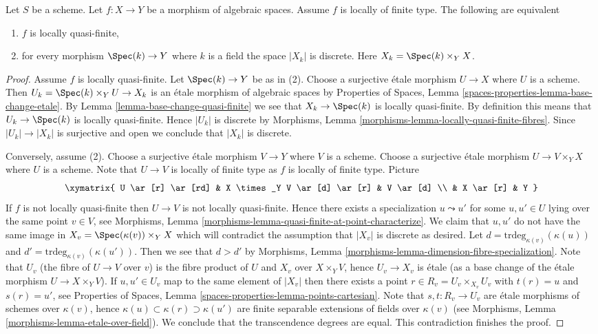 \begin{lemma}
\label{lemma-locally-quasi-finite}
Let $S$ be a scheme. Let $f : X \to Y$ be a morphism of algebraic spaces.
Assume $f$ is locally of finite type. The following are equivalent
\begin{enumerate}
\item $f$ is locally quasi-finite,
\item for every morphism $\Spec(k) \to Y$ where $k$ is a field
the space $|X_k|$ is discrete. Here $X_k = \Spec(k) \times_Y X$.
\end{enumerate}
\end{lemma}

\begin{proof}
Assume $f$ is locally quasi-finite. Let $\Spec(k) \to Y$ be as
in (2). Choose a surjective \'etale morphism $U \to X$ where $U$ is a scheme.
Then $U_k = \Spec(k) \times_Y U \to X_k$ is an
\'etale morphism of algebraic spaces by
Properties of Spaces, Lemma \ref{spaces-properties-lemma-base-change-etale}.
By
Lemma \ref{lemma-base-change-quasi-finite}
we see that $X_k \to \Spec(k)$ is locally quasi-finite. By
definition this means that $U_k \to \Spec(k)$ is locally
quasi-finite. Hence $|U_k|$ is discrete by
Morphisms, Lemma \ref{morphisms-lemma-locally-quasi-finite-fibres}.
Since $|U_k| \to |X_k|$ is surjective and open we conclude that $|X_k|$
is discrete.

\medskip\noindent
Conversely, assume (2). Choose a surjective \'etale morphism $V \to Y$
where $V$ is a scheme. Choose a surjective \'etale morphism
$U \to V \times_Y X$ where $U$ is a scheme.
Note that $U \to V$ is locally of finite type as $f$ is locally of finite type.
Picture
$$
\xymatrix{
U \ar[r] \ar[rd] & X \times_Y V \ar[d] \ar[r] & V \ar[d] \\
& X \ar[r] & Y
}
$$
If $f$ is not locally quasi-finite then $U \to V$ is not locally quasi-finite.
Hence there exists a specialization $u \leadsto u'$ for some $u, u' \in U$
lying over the same point $v \in V$, see
Morphisms, Lemma \ref{morphisms-lemma-quasi-finite-at-point-characterize}.
We claim that $u, u'$ do not have the same image in
$X_v = \Spec(\kappa(v)) \times_Y X$
which will contradict the assumption that $|X_v|$ is discrete as desired.
Let $d = \text{trdeg}_{\kappa(v)}(\kappa(u))$ and
$d' = \text{trdeg}_{\kappa(v)}(\kappa(u'))$.
Then we see that $d > d'$ by
Morphisms, Lemma \ref{morphisms-lemma-dimension-fibre-specialization}.
Note that $U_v$ (the fibre of $U \to V$ over $v$) is the fibre product of
$U$ and $X_v$ over $X \times_Y V$, hence $U_v \to X_v$ is \'etale (as a
base change of the \'etale morphism $U \to X \times_Y V$). If
$u, u' \in U_v$ map to the same element of $|X_v|$ then there exists a point
$r \in R_v = U_v \times_{X_v} U_v$ with $t(r) = u$ and $s(r) = u'$, see
Properties of Spaces, Lemma \ref{spaces-properties-lemma-points-cartesian}.
Note that $s, t : R_v \to U_v$ are \'etale morphisms of schemes
over $\kappa(v)$, hence $\kappa(u) \subset \kappa(r) \supset \kappa(u')$
are finite separable extensions of fields over $\kappa(v)$ (see
Morphisms, Lemma \ref{morphisms-lemma-etale-over-field}).
We conclude that the transcendence degrees are equal.
This contradiction finishes the proof.
\end{proof}

